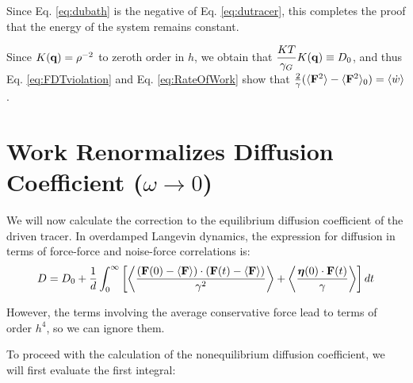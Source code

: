 \documentclass[amsmath,preprintnumbers,10pt,article,notitlepage]{revtex4-1}
\begin{document}
Since Eq. \ref{eq:dubath} is the negative of Eq. \ref{eq:dutracer}, this completes the proof that the energy of the system remains constant.

Since $K({\bf q}) = \rho^{-2} $ to zeroth order in $h$, we obtain that $\dfrac{KT}{\gamma_G} K({\bf q}) \equiv D_0$, and thus Eq. \ref{eq:FDTviolation} and Eq. \ref{eq:RateOfWork} show that $\frac{2}{\gamma}(\langle {\bf F}^2 \rangle - \langle {\bf F}^2 \rangle_0) = \langle \dot{w} \rangle$.

\section{Work Renormalizes Diffusion Coefficient ($\omega \rightarrow 0$) }

We will now calculate the correction to the equilibrium diffusion coefficient of the driven tracer. 
In overdamped Langevin dynamics, the expression for diffusion in terms of force-force and noise-force correlations is: 
\begin{equation}
D = D_0 + \frac{1}{d} \int_0^\infty  \left[\left \langle \frac{({\bf F}(0) - \langle {\bf F} \rangle) \cdot ({\bf F}(t)-\langle {\bf F} \rangle)}{\gamma^2}\right \rangle  + \left \langle \frac{{\bm \eta}(0) \cdot {\bf F}(t)}{\gamma} \right \rangle \right]{d}t 
\label{eq:diffusion}
\end{equation}

However, the terms involving the average conservative force lead to terms of order $h^4$, so we can ignore them.

To proceed with the calculation of the nonequilibrium diffusion coefficient, we will first evaluate the first integral:
\end{document}

